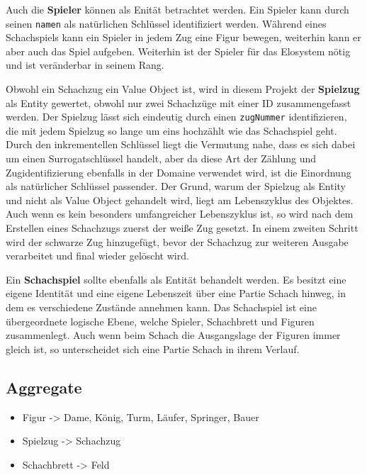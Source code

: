 Auch die \textbf{Spieler} können als Enität betrachtet werden. 
Ein Spieler kann durch seinen \texttt{namen} als natürlichen Schlüssel identifiziert werden. 
Während eines Schachspiels kann ein Spieler in jedem Zug eine Figur bewegen, weiterhin kann er aber auch das Spiel aufgeben. 
Weiterhin ist der Spieler für das Elosystem nötig und ist veränderbar in seinem Rang. 

Obwohl ein Schachzug ein Value Object ist, wird in diesem Projekt der \textbf{Spielzug} als Entity gewertet, obwohl nur zwei Schachzüge mit einer ID zusammengefasst werden. 
Der Spielzug lässt sich eindeutig durch einen \texttt{zugNummer} identifizieren, die mit jedem Spielzug so lange um eins hochzählt wie das Schachspiel geht. 
Durch den inkrementellen Schlüssel liegt die Vermutung nahe, dass es sich dabei um einen Surrogatschlüssel handelt, aber da diese Art der Zählung und Zugidentifizierung ebenfalls in der Domaine verwendet wird, ist die Einordnung als natürlicher Schlüssel passender. 
Der Grund, warum der Spielzug als Entity und nicht als Value Object gehandelt wird, liegt am Lebenszyklus des Objektes. 
Auch wenn es kein besonders umfangreicher Lebenszyklus ist, so wird nach dem Erstellen eines Schachzugs zuerst der weiße Zug gesetzt.
In einem zweiten Schritt wird der schwarze Zug hinzugefügt, bevor der Schachzug zur weiteren Ausgabe verarbeitet und final wieder gelöscht wird. 


Ein \textbf{Schachspiel} sollte ebenfalls als Entität behandelt werden. 
Es besitzt eine eigene Identität und eine eigene Lebenszeit über eine Partie Schach hinweg, in dem es verschiedene Zustände annehmen kann. 
Das Schachspiel ist eine übergeordnete logische Ebene, welche Spieler, Schachbrett und Figuren zusammenlegt. 
Auch wenn beim Schach die Ausgangslage der Figuren immer gleich ist, so unterscheidet sich eine Partie Schach in ihrem Verlauf. 

\subsection*{Aggregate}

\begin{itemize}
    \item Figur -> Dame, König, Turm, Läufer, Springer, Bauer
    \item Spielzug -> Schachzug
    \item Schachbrett -> Feld
\end{itemize}


